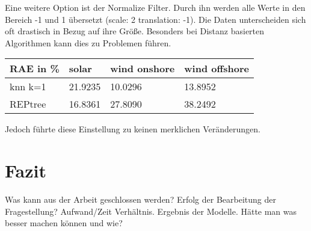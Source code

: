 \documentclass[letterpaper]{article} %
\begin{document}
    Eine weitere Option ist der Normalize Filter. Durch ihn werden alle Werte in den Bereich -1 und 1 übersetzt (scale: 2 translation: -1). Die Daten unterscheiden sich oft drastisch in Bezug auf ihre Größe. Besonders bei Distanz basierten Algorithmen kann dies zu Problemen führen.
    \hfill\break
    \begin{center}
        \begin{tabular}{|l||l|l|l|}
            \hline
            RAE in \%&solar&wind onshore&wind offshore\\
            \hline
            \hline
            knn k=1&21.9235&10.0296&13.8952\\
            \hline
            REPtree&16.8361&27.8090&38.2492\\
            \hline
        \end{tabular}
    \end{center}
    \hfill\break
    Jedoch führte diese Einstellung zu keinen merklichen Veränderungen.

\section*{Fazit}
    Was kann aus der Arbeit geschlossen werden? Erfolg der Bearbeitung der Fragestellung? Aufwand/Zeit Verhältnis. Ergebnis der Modelle. Hätte man was besser machen können und wie?


\end{document}
